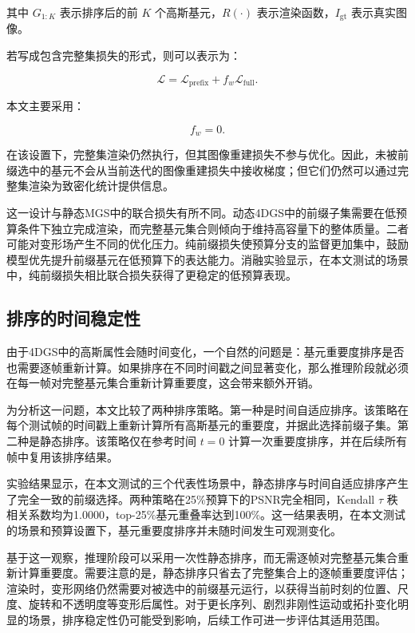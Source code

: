 \documentclass[sn-mathphys]{sn-jnl}
\begin{document}
其中 $G_{1:K}$ 表示排序后的前 $K$ 个高斯基元，$R(\cdot)$ 表示渲染函数，$I_{\mathrm{gt}}$ 表示真实图像。

若写成包含完整集损失的形式，则可以表示为：

\begin{equation}
\mathcal{L}
=
\mathcal{L}_{\mathrm{prefix}}
+
f_w \mathcal{L}_{\mathrm{full}}.
\end{equation}

本文主要采用：

\begin{equation}
f_w = 0.
\end{equation}

在该设置下，完整集渲染仍然执行，但其图像重建损失不参与优化。因此，未被前缀选中的基元不会从当前迭代的图像重建损失中接收梯度；但它们仍然可以通过完整集渲染为致密化统计提供信息。

这一设计与静态MGS中的联合损失有所不同。动态4DGS中的前缀子集需要在低预算条件下独立完成渲染，而完整基元集合则倾向于维持高容量下的整体质量。二者可能对变形场产生不同的优化压力。纯前缀损失使预算分支的监督更加集中，鼓励模型优先提升前缀基元在低预算下的表达能力。消融实验显示，在本文测试的场景中，纯前缀损失相比联合损失获得了更稳定的低预算表现。

\subsection{排序的时间稳定性}
\label{sec:static}

由于4DGS中的高斯属性会随时间变化，一个自然的问题是：基元重要度排序是否也需要逐帧重新计算。如果排序在不同时间戳之间显著变化，那么推理阶段就必须在每一帧对完整基元集合重新计算重要度，这会带来额外开销。

为分析这一问题，本文比较了两种排序策略。第一种是时间自适应排序。该策略在每个测试帧的时间戳上重新计算所有高斯基元的重要度，并据此选择前缀子集。第二种是静态排序。该策略仅在参考时间 $t=0$ 计算一次重要度排序，并在后续所有帧中复用该排序结果。

实验结果显示，在本文测试的三个代表性场景中，静态排序与时间自适应排序产生了完全一致的前缀选择。两种策略在25\%预算下的PSNR完全相同，Kendall $\tau$ 秩相关系数均为1.0000，top-25\%基元重叠率达到100\%。这一结果表明，在本文测试的场景和预算设置下，基元重要度排序并未随时间发生可观测变化。

基于这一观察，推理阶段可以采用一次性静态排序，而无需逐帧对完整基元集合重新计算重要度。需要注意的是，静态排序只省去了完整集合上的逐帧重要度评估；渲染时，变形网络仍然需要对被选中的前缀基元运行，以获得当前时刻的位置、尺度、旋转和不透明度等变形后属性。对于更长序列、剧烈非刚性运动或拓扑变化明显的场景，排序稳定性仍可能受到影响，后续工作可进一步评估其适用范围。
\end{document}
